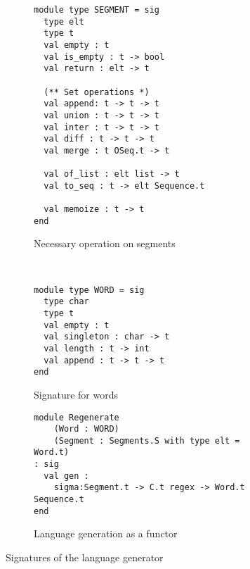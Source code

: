 \begin{figure}[h]
  \centering
  \begin{subfigure}{0.44\linewidth}
\begin{lstlisting}[basicstyle=\scriptsize\ttfamily]
module type SEGMENT = sig
  type elt
  type t
  val empty : t
  val is_empty : t -> bool
  val return : elt -> t

  (** Set operations *)
  val append: t -> t -> t
  val union : t -> t -> t
  val inter : t -> t -> t
  val diff : t -> t -> t
  val merge : t OSeq.t -> t

  val of_list : elt list -> t
  val to_seq : t -> elt Sequence.t

  val memoize : t -> t
end
\end{lstlisting}
    \caption{Necessary operation on segments}
    \label{code:sigs:segment}
  \end{subfigure}~
  \begin{subfigure}{0.57\linewidth}
\begin{lstlisting}[basicstyle=\scriptsize\ttfamily]
module type WORD = sig
  type char
  type t
  val empty : t
  val singleton : char -> t
  val length : t -> int
  val append : t -> t -> t
end
\end{lstlisting}
    \caption{Signature for words}
    \label{code:sigs:word}
\begin{lstlisting}[basicstyle=\scriptsize\ttfamily]
module Regenerate
    (Word : WORD)
    (Segment : Segments.S with type elt = Word.t)
: sig
  val gen : 
    sigma:Segment.t -> C.t regex -> Word.t Sequence.t
end
\end{lstlisting}
    \caption{Language generation as a functor}
    \label{code:sigs:regen}
  \end{subfigure}
  \caption{Signatures of the language generator}
  \label{code:sigs}
\end{figure}

